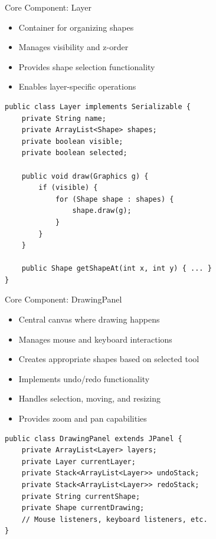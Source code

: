 \documentclass{beamer}
\begin{document}
\begin{frame}[fragile]{Core Component: Layer}
\begin{itemize}
\item Container for organizing shapes
\item Manages visibility and z-order
\item Provides shape selection functionality
\item Enables layer-specific operations
\end{itemize}

\begin{verbatim}
public class Layer implements Serializable {
    private String name;
    private ArrayList<Shape> shapes;
    private boolean visible;
    private boolean selected;
    
    public void draw(Graphics g) {
        if (visible) {
            for (Shape shape : shapes) {
                shape.draw(g);
            }
        }
    }
    
    public Shape getShapeAt(int x, int y) { ... }
}
\end{verbatim}
\end{frame}

\begin{frame}[fragile]{Core Component: DrawingPanel}
\begin{itemize}
\item Central canvas where drawing happens
\item Manages mouse and keyboard interactions
\item Creates appropriate shapes based on selected tool
\item Implements undo/redo functionality
\item Handles selection, moving, and resizing
\item Provides zoom and pan capabilities
\end{itemize}

\begin{verbatim}
public class DrawingPanel extends JPanel {
    private ArrayList<Layer> layers;
    private Layer currentLayer;
    private Stack<ArrayList<Layer>> undoStack;
    private Stack<ArrayList<Layer>> redoStack;
    private String currentShape;
    private Shape currentDrawing;
    // Mouse listeners, keyboard listeners, etc.
}
\end{verbatim}
\end{frame}
\end{document}
